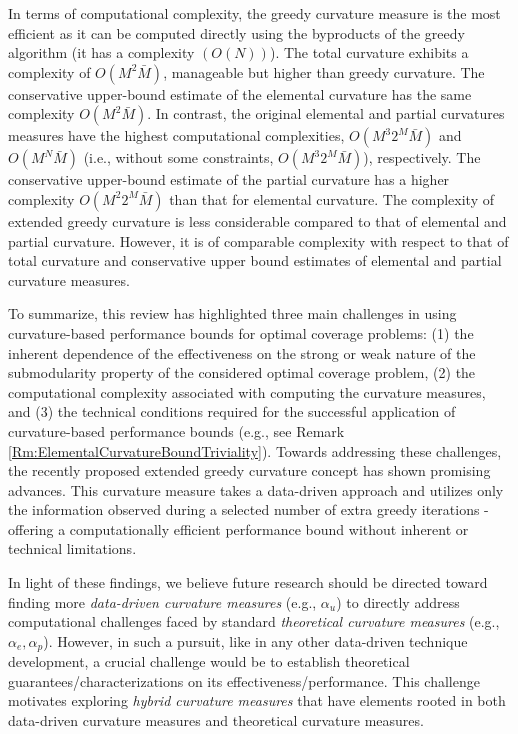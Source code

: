 \documentclass[letterpaper, 10 pt, conference]{ieeeconf}
\begin{document}
In terms of computational complexity, the greedy curvature measure is the most efficient as it can be computed directly using the byproducts of the greedy algorithm (it has a complexity $(O(N))$).
The total curvature exhibits a complexity of \(O(M^2\bar{M})\), manageable but higher than greedy curvature. The conservative upper-bound estimate of the elemental curvature has the same complexity $O(M^2\bar{M})$. In contrast, the original elemental and partial curvatures measures have the highest computational complexities, $O(M^3 2^M \bar{M})$ and $O(M^N\bar{M})$ (i.e., without some constraints, $O(M^3 2^M \bar{M})$), respectively. The conservative upper-bound estimate of the partial curvature has a higher complexity \(O(M^2 2^M \bar{M})\) than that for elemental curvature. The complexity of extended greedy curvature is less considerable compared to that of elemental and partial curvature. However, it is of comparable complexity with respect to that of total curvature and conservative upper bound estimates of elemental and partial curvature measures. 


To summarize, this review has highlighted three main challenges in using curvature-based performance bounds for optimal coverage problems: 
(1) the inherent dependence of the effectiveness on the strong or weak nature of the submodularity property of the considered optimal coverage problem,  
(2) the computational complexity associated with computing the curvature measures, and 
(3) the technical conditions required for the successful application of curvature-based performance bounds (e.g., see Remark \ref{Rm:ElementalCurvatureBoundTriviality}). Towards addressing these challenges, the recently proposed extended greedy curvature concept \cite{WelikalaJ02021} has shown promising advances. This curvature measure takes a data-driven approach and utilizes only the information observed during a selected number of extra greedy iterations - offering a computationally efficient performance bound without inherent or technical limitations. 

In light of these findings, we believe future research should be directed toward finding more \emph{data-driven curvature measures} (e.g., $\alpha_u$) to directly address computational challenges faced by standard \emph{theoretical curvature measures} (e.g., $\alpha_e,\alpha_p$). However, in such a pursuit, like in any other data-driven technique development, a crucial challenge would be to establish theoretical guarantees/characterizations on its effectiveness/performance. This challenge motivates exploring \emph{hybrid curvature measures} that have elements rooted in both data-driven curvature measures and theoretical curvature measures. 
\end{document}
